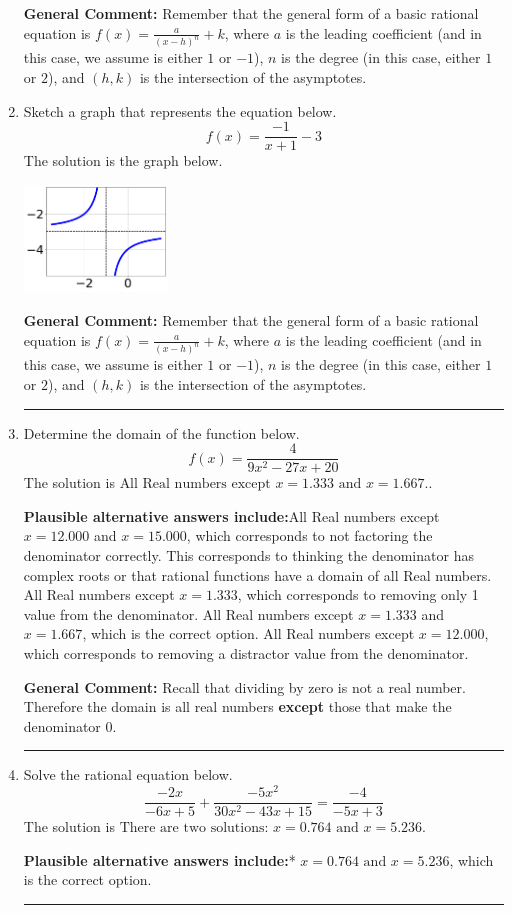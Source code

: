 \documentclass{extbook}[14pt]
\newcommand{\litem}[1]{\item #1

\rule{\textwidth}{0.4pt}}
\begin{document}
\begin{enumerate}
{\textbf{General Comment:} Remember that the general form of a basic rational equation is $ f(x) = \frac{a}{(x-h)^n} + k$, where $a$ is the leading coefficient (and in this case, we assume is either $1$ or $-1$), $n$ is the degree (in this case, either $1$ or $2$), and $(h, k)$ is the intersection of the asymptotes.
}
\litem{
Sketch a graph that represents the equation below.
\[ f(x) = \frac{-1}{x + 1} - 3 \]The solution is the graph below.
    \begin{center}
        \includegraphics[width=0.3\textwidth]{../Figures/rationalEquationToGraphEB.png}
    \end{center}

\textbf{General Comment:} Remember that the general form of a basic rational equation is $ f(x) = \frac{a}{(x-h)^n} + k$, where $a$ is the leading coefficient (and in this case, we assume is either $1$ or $-1$), $n$ is the degree (in this case, either $1$ or $2$), and $(h, k)$ is the intersection of the asymptotes.
}
\litem{
Determine the domain of the function below.
\[ f(x) = \frac{4}{9x^{2} -27 x + 20} \]The solution is \( \text{All Real numbers except } x = 1.333 \text{ and } x = 1.667. \).\begin{enumerate}[label=\Alph*.]
\textbf{Plausible alternative answers include:}All Real numbers except $x = 12.000$ and $x = 15.000$, which corresponds to not factoring the denominator correctly.
This corresponds to thinking the denominator has complex roots or that rational functions have a domain of all Real numbers.
All Real numbers except $x = 1.333$, which corresponds to removing only 1 value from the denominator.
All Real numbers except $x = 1.333$ and $x = 1.667$, which is the correct option.
All Real numbers except $x = 12.000$, which corresponds to removing a distractor value from the denominator.
\end{enumerate}

\textbf{General Comment:} Recall that dividing by zero is not a real number. Therefore the domain is all real numbers \textbf{except} those that make the denominator 0.
}
\litem{
Solve the rational equation below.
\[ \frac{-2x}{-6x + 5} + \frac{-5x^{2}}{30x^{2} -43 x + 15} = \frac{-4}{-5x + 3} \]The solution is \( \text{There are two solutions: } x = 0.764 \text{ and } x = 5.236 \).\begin{enumerate}[label=\Alph*.]
\textbf{Plausible alternative answers include:}* $x = 0.764 \text{ and } x = 5.236$, which is the correct option.





\end{enumerate}}
\end{enumerate}
\end{document}
